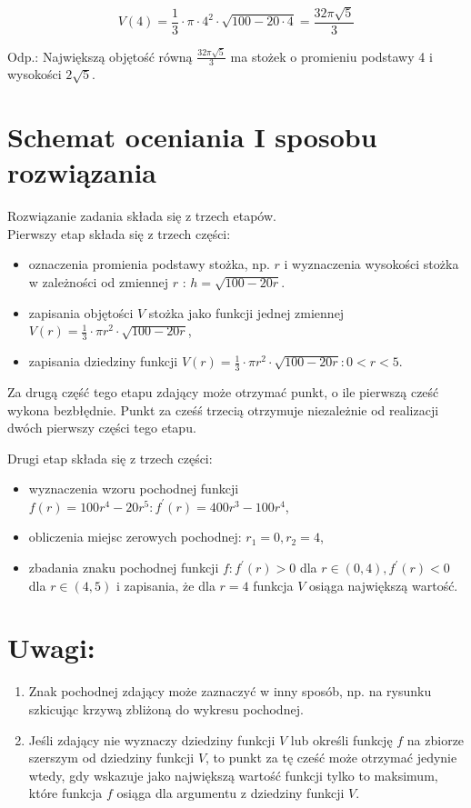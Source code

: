 \documentclass[10pt]{article}
\begin{document}
$$
V(4)=\frac{1}{3} \cdot \pi \cdot 4^{2} \cdot \sqrt{100-20 \cdot 4}=\frac{32 \pi \sqrt{5}}{3}
$$

Odp.: Największą objętość równą $\frac{32 \pi \sqrt{5}}{3}$ ma stożek o promieniu podstawy 4 i wysokości $2 \sqrt{5}$.

\section*{Schemat oceniania I sposobu rozwiązania}
Rozwiązanie zadania składa się z trzech etapów.\\
Pierwszy etap składa się z trzech części:

\begin{itemize}
  \item oznaczenia promienia podstawy stożka, np. $r$ i wyznaczenia wysokości stożka w zależności od zmiennej $r$ : $h=\sqrt{100-20 r}$.
  \item zapisania objętości $V$ stożka jako funkcji jednej zmiennej $V(r)=\frac{1}{3} \cdot \pi r^{2} \cdot \sqrt{100-20 r}$,
  \item zapisania dziedziny funkcji $V(r)=\frac{1}{3} \cdot \pi r^{2} \cdot \sqrt{100-20 r}: 0<r<5$.
\end{itemize}

Za drugą część tego etapu zdający może otrzymać punkt, o ile pierwszą cześć wykona bezbłędnie. Punkt za cześś trzecią otrzymuje niezależnie od realizacji dwóch pierwszy części tego etapu.

Drugi etap składa się z trzech części:

\begin{itemize}
  \item wyznaczenia wzoru pochodnej funkcji $f(r)=100 r^{4}-20 r^{5}: f^{\prime}(r)=400 r^{3}-100 r^{4}$,
  \item obliczenia miejsc zerowych pochodnej: $r_{1}=0, r_{2}=4$,
  \item zbadania znaku pochodnej funkcji $f: f^{\prime}(r)>0$ dla $r \in(0,4), f^{\prime}(r)<0$ dla $r \in(4,5)$ i zapisania, że dla $r=4$ funkcja $V$ osiąga największą wartość.
\end{itemize}

\section*{Uwagi:}
\begin{enumerate}
  \item Znak pochodnej zdający może zaznaczyć w inny sposób, np. na rysunku szkicując krzywą zbliżoną do wykresu pochodnej.
  \item Jeśli zdający nie wyznaczy dziedziny funkcji $V$ lub określi funkcję $f$ na zbiorze szerszym od dziedziny funkcji $V$, to punkt za tę cześć może otrzymać jedynie wtedy, gdy wskazuje jako największą wartość funkcji tylko to maksimum, które funkcja $f$ osiąga dla argumentu z dziedziny funkcji $V$.
\end{enumerate}
\end{document}
